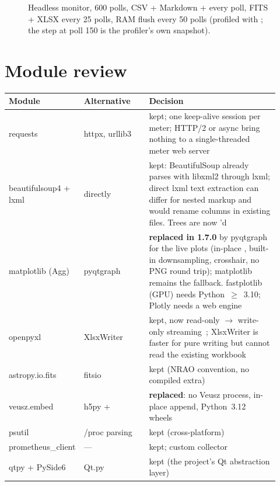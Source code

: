 \documentclass[11pt,a4paper]{article}
\newcommand{\code}[1]{\texttt{\detokenize{#1}}}
\begin{document}
\begin{figure}[ht]
  \centering
  \caption{Headless monitor, 600 polls, CSV + Markdown + \code{.vszh5} every poll,
  FITS + XLSX every 25 polls, RAM flush every 50 polls (profiled with
  \code{tracemalloc}; the step at poll 150 is the profiler's own snapshot).}
  \label{fig:headless}
\end{figure}

\section{Module review}
\begin{longtable}{@{}p{0.2\linewidth}p{0.24\linewidth}p{0.48\linewidth}@{}}
\toprule
Module & Alternative & Decision \\
\midrule
\endhead
requests & httpx, urllib3 & kept; one keep-alive session per meter; HTTP/2 or async bring nothing to a single-threaded meter web server \\
beautifulsoup4 + lxml & \code{lxml.html} directly & kept: BeautifulSoup already parses with libxml2 through lxml; direct lxml text extraction can differ for nested markup and would rename columns in existing files. Trees are now \code{decompose()}'d \\
matplotlib (Agg) & pyqtgraph & \textbf{replaced in 1.7.0} by pyqtgraph for the live plots (in-place \code{setData}, built-in downsampling, crosshair, no PNG round trip); matplotlib remains the fallback. fastplotlib (GPU) needs Python~$\ge$~3.10; Plotly needs a web engine \\
openpyxl & XlsxWriter & kept, now read-only $\rightarrow$ write-only streaming~\cite{openpyxl_opt}; XlsxWriter is faster for pure writing but cannot read the existing workbook \\
astropy.io.fits & fitsio & kept (NRAO convention, no compiled extra) \\
veusz.embed & h5py + \code{vszh5_writer} & \textbf{replaced}: no Veusz process, in-place append, Python~3.12 wheels \\
psutil & /proc parsing & kept (cross-platform) \\
prometheus\_client & --- & kept; custom collector \\
qtpy + PySide6 & Qt.py & kept (the project's Qt abstraction layer) \\
\bottomrule
\end{longtable}
\end{document}
